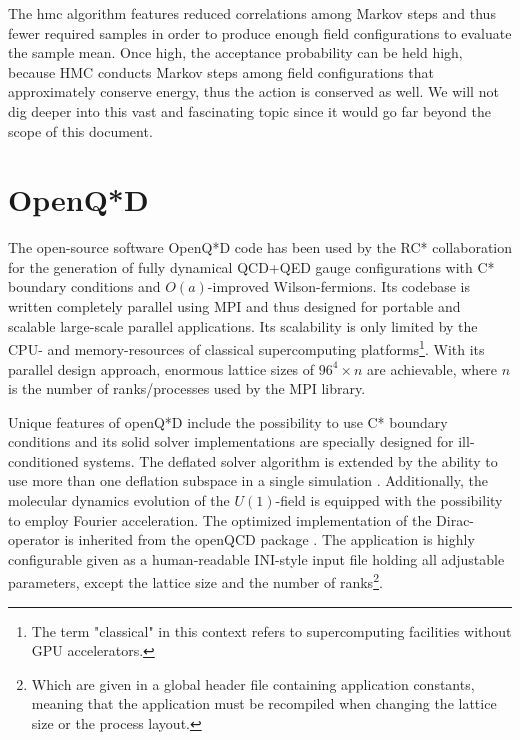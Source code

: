 \documentclass{article}
\theoremstyle{plain} %
\theoremstyle{convention} %
\theoremstyle{remark} %
\numberwithin{equation}{section}
\begin{document}
The \acrshort{hmc} algorithm \cite{duane1987} features reduced correlations among Markov steps and thus fewer required samples in order to produce enough field configurations to evaluate the sample mean. Once high, the acceptance probability can be held high, because HMC conducts Markov steps among field configurations that approximately conserve energy, thus the action is conserved as well. We will not dig deeper into this vast and fascinating topic since it would go far beyond the scope of this document.

\section{OpenQ*D}

\label{sec:openqxd}

The open-source software OpenQ*D code has been used by the RC* collaboration for the generation of fully dynamical QCD+QED gauge configurations with C* boundary conditions and $O(a)$-improved Wilson-fermions. Its codebase is written completely parallel using MPI and thus designed for portable and scalable large-scale parallel applications. Its scalability is only limited by the CPU- and memory-resources of classical supercomputing platforms\footnote{The term "classical" in this context refers to supercomputing facilities without GPU accelerators.}. With its parallel design approach, enormous lattice sizes of $96^4 \times n$ are achievable, where $n$ is the number of ranks/processes used by the MPI library.

Unique features of openQ*D include the possibility to use C* boundary conditions and its solid solver implementations are specially designed for ill-conditioned systems. The deflated solver algorithm is extended by the ability to use more than one deflation subspace in a single simulation \cite{openqxd}. Additionally, the molecular dynamics evolution of the $U(1)$-field is equipped with the possibility to employ Fourier acceleration. The optimized implementation of the Dirac-operator is inherited from the openQCD package \cite{openqcd}. The application is highly configurable given as a human-readable INI-style input file holding all adjustable parameters, except the lattice size and the number of ranks\footnote{Which are given in a global header file containing application constants, meaning that the application must be recompiled when changing the lattice size or the process layout.}.
\end{document}
